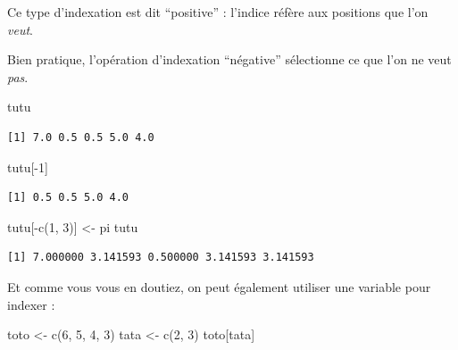 \documentclass[
  letterpaper,
  DIV=11,
  numbers=noendperiod]{scrreprt}
\newenvironment{Shaded}{\begin{snugshade}}{\end{snugshade}}
\newcommand{\DecValTok}[1]{\textcolor[rgb]{0.68,0.00,0.00}{#1}}
\newcommand{\FunctionTok}[1]{\textcolor[rgb]{0.28,0.35,0.67}{#1}}
\newcommand{\NormalTok}[1]{\textcolor[rgb]{0.00,0.23,0.31}{#1}}
\newcommand{\OtherTok}[1]{\textcolor[rgb]{0.00,0.23,0.31}{#1}}
\newcommand{\SpecialCharTok}[1]{\textcolor[rgb]{0.37,0.37,0.37}{#1}}
\begin{document}
Ce type d'indexation est dit ``positive'' : l'indice réfère aux
positions que l'on \emph{veut}.

Bien pratique, l'opération d'indexation ``négative'' sélectionne ce que
l'on ne veut \emph{pas}.

\begin{Shaded}
\begin{Highlighting}[]
\NormalTok{tutu}
\end{Highlighting}
\end{Shaded}

\begin{verbatim}
[1] 7.0 0.5 0.5 5.0 4.0
\end{verbatim}

\begin{Shaded}
\begin{Highlighting}[]
\NormalTok{tutu[}\SpecialCharTok{{-}}\DecValTok{1}\NormalTok{]}
\end{Highlighting}
\end{Shaded}

\begin{verbatim}
[1] 0.5 0.5 5.0 4.0
\end{verbatim}

\begin{Shaded}
\begin{Highlighting}[]
\NormalTok{tutu[}\SpecialCharTok{{-}}\FunctionTok{c}\NormalTok{(}\DecValTok{1}\NormalTok{, }\DecValTok{3}\NormalTok{)] }\OtherTok{\textless{}{-}}\NormalTok{ pi}
\NormalTok{tutu}
\end{Highlighting}
\end{Shaded}

\begin{verbatim}
[1] 7.000000 3.141593 0.500000 3.141593 3.141593
\end{verbatim}

Et comme vous vous en doutiez, on peut également utiliser une variable
pour indexer :

\begin{Shaded}
\begin{Highlighting}[]
\NormalTok{toto }\OtherTok{\textless{}{-}} \FunctionTok{c}\NormalTok{(}\DecValTok{6}\NormalTok{, }\DecValTok{5}\NormalTok{, }\DecValTok{4}\NormalTok{, }\DecValTok{3}\NormalTok{)}
\NormalTok{tata }\OtherTok{\textless{}{-}} \FunctionTok{c}\NormalTok{(}\DecValTok{2}\NormalTok{, }\DecValTok{3}\NormalTok{)}
\NormalTok{toto[tata]}
\end{Highlighting}
\end{Shaded}
\end{document}
